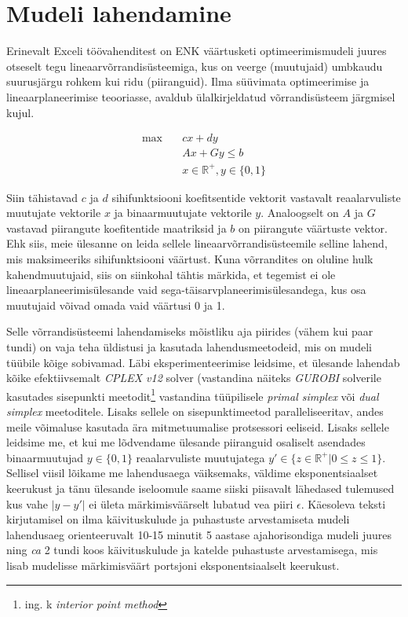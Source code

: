\documentclass[10pt,a4paper]{article}
\begin{document}
\section{Mudeli lahendamine}
\label{sec:lahendamine}
Erinevalt Exceli töövahenditest on ENK väärtusketi optimeerimismudeli juures otseselt tegu lineaarvõrrandisüsteemiga, kus on veerge (muutujaid) umbkaudu suurusjärgu rohkem kui ridu (piiranguid). Ilma süüvimata optimeerimise ja lineaarplaneerimise teooriasse, avaldub ülalkirjeldatud võrrandisüsteem järgmisel kujul.

\printindex
\begin{align}
\mathrm{max} \quad &cx + dy \nonumber\\
&Ax + Gy \leq b \nonumber \\
&x \in \mathbb{R^+}, y \in \{0,1\} \nonumber
\end{align}

Siin tähistavad $c$ ja $d$ sihifunktsiooni koefitsentide vektorit vastavalt reaalarvuliste muutujate vektorile $x$ ja binaarmuutujate vektorile $y$. Analoogselt on $A$ ja $G$ vastavad piirangute koefitentide maatriksid ja $b$ on piirangute väärtuste vektor.
Ehk siis, meie ülesanne on leida sellele lineaarvõrrandisüsteemile selline lahend, mis maksimeeriks sihifunktsiooni väärtust. Kuna võrrandites on oluline hulk kahendmuutujaid, siis on siinkohal tähtis märkida, et tegemist ei ole lineaarplaneerimisülesande vaid sega-täisarvplaneerimisülesandega, kus osa muutujaid võivad omada vaid väärtusi 0 ja 1. 

Selle võrrandisüsteemi lahendamiseks mõistliku aja piirides (vähem kui paar tundi) on vaja teha üldistusi ja kasutada lahendusmeetodeid, mis on mudeli tüübile kõige sobivamad. Läbi eksperimenteerimise leidsime, et ülesande lahendab kõike efektiivsemalt \emph{CPLEX v12} solver (vastandina näiteks \emph{GUROBI} solverile kasutades sisepunkti meetodit\footnote{ing. k \emph{interior point method}} vastandina tüüpilisele \emph{primal simplex} või \emph{dual simplex} meetoditele\cite{Hillier1995}. Lisaks sellele on sisepunktimeetod paralleliseeritav, andes meile võimaluse kasutada ära mitmetuumalise protsessori eeliseid. Lisaks sellele leidsime me, et kui me lõdvendame ülesande piiranguid osaliselt asendades binaarmuutujad $y \in \{0,1\}$ reaalarvuliste muutujatega $y' \in \{z\in \mathbb{R^+} | 0 \leq z \leq 1\}$. Sellisel viisil lõikame me lahendusaega väiksemaks, väldime eksponentsiaalset keerukust ja tänu ülesande iseloomule saame siiski piisavalt lähedased tulemused kus vahe $|y-y'|$ ei ületa märkimisväärselt lubatud vea piiri $\epsilon$. Käesoleva teksti kirjutamisel on ilma käivituskulude ja puhastuste arvestamiseta mudeli lahendusaeg orienteeruvalt 10-15 minutit 5 aastase ajahorisondiga mudeli juures ning \emph{ca} 2 tundi koos käivituskulude ja katelde puhastuste arvestamisega, mis lisab mudelisse märkimisväärt portsjoni eksponentsiaalselt keerukust.
\end{document}
